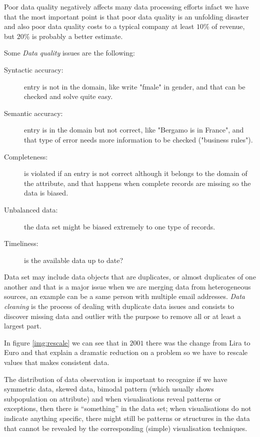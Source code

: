 Poor data quality negatively affects many data processing efforts infact we have that the most important point
is that poor data quality is an unfolding disaster and also poor data quality costs to a typical company
at least $10\%$ of revenue, but $20\%$ is probably a better estimate.

Some \emph{Data quality} issues are the following:
\begin{description}
    \item [Syntactic accuracy: ] entry is not in the domain, like write "fmale" in gender, and that can be 
                                  checked and solve quite easy.
    \item [Semantic accuracy: ] entry is in the domain but not correct, like "Bergamo is in France", and 
                                that type of error needs more information to be checked ("business rules").
    \item [Completeness: ] is violated if an entry is not correct although it belongs to the domain of the attribute,
                           and that happens when complete records are missing so the data is biased.

    \item [Unbalanced data: ] the data set might be biased extremely to one type of records.
    \item [Timeliness: ] is the available data up to date?
\end{description}
Data set may include data objects that are duplicates, or almost duplicates of one another and that is 
a major issue when we are merging data from heterogeneous sources, an example can be a same person with
multiple email addresses.
\emph{Data cleaning} is the process of dealing with duplicate data issues and consists to discover 
missing data and outlier with the purpose to remove all or at least a largest part.

In figure \ref{img:rescale} we can see that in $2001$ there was the change from Lira to Euro and 
that explain a dramatic reduction on a problem so we have to rescale values that makes consistent data.

The distribution of data observation is important to recognize if we have symmetric data, skewed data, bimodal
pattern (which usually shows subpopulation on attribute) and when visualisations reveal patterns or exceptions,
then there is “something” in the data set; when visualisations do not indicate anything specific,
there might still be patterns or structures in the data that cannot be revealed by the corresponding
(simple) visualisation techniques.


